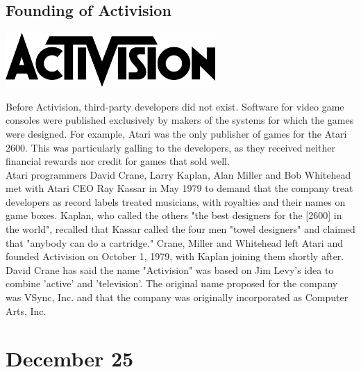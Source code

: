 \documentclass[11pt]{report}
\begin{document}
\subsection{Founding of Activision}
\vspace{2mm}\begin{center}\includegraphics[width=8cm]{./img/activisionLogo.jpg}\end{center}
Before Activision, third-party developers did not exist. Software for video game consoles were published exclusively by makers of the systems for which the games were designed. For example, Atari was the only publisher of games for the Atari 2600. This was particularly galling to the developers, as they received neither financial rewards nor credit for games that sold well.\\
\indent Atari programmers David Crane, Larry Kaplan, Alan Miller and Bob Whitehead met with Atari CEO Ray Kassar in May 1979 to demand that the company treat developers as record labels treated musicians, with royalties and their names on game boxes. Kaplan, who called the others "the best designers for the [2600] in the world", recalled that Kassar called the four men "towel designers" and claimed that "anybody can do a cartridge." Crane, Miller and Whitehead left Atari and founded Activision on October 1, 1979, with Kaplan joining them shortly after. David Crane has said the name "Activision" was based on Jim Levy's idea to combine 'active' and 'television'. The original name proposed for the company was VSync, Inc. and that the company was originally incorporated as Computer Arts, Inc.
\section{December 25}
\end{document}
